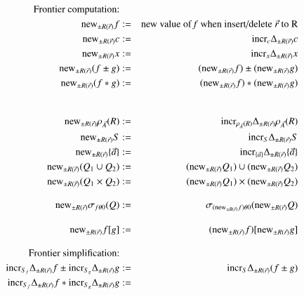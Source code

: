 \documentclass{article}
\begin{document}
%
%
\begin{figure*}
\begin{eqnarray}
\mbox{Frontier computation:} && \nonumber
\\
\nonumber\algnew_{\pm R(\vec{r})} f &:=& \mbox{new value of \emph{f} when insert/delete } \vec{r} \mbox{ to R}\\
\label{eq:new1}
\algnew_{\pm R(\vec{r})} c       &:=& \algincr_{c} \Delta_{\pm R(\vec{r})} c \\
\label{eq:new2}
\algnew_{\pm R(\vec{r})} x       &:=& \algincr_{x} \Delta_{\pm R(\vec{r})} x \\
\label{eq:new3}
\algnew_{\pm R(\vec{r})} (f \pm g) &:=&
(\algnew_{\pm R(\vec{r})} f) \pm (\algnew_{\pm R(\vec{r})} g) \\
\label{eq:new4}
\algnew_{\pm R(\vec{r})} (f * g) &:=&
(\algnew_{\pm R(\vec{r})} f) * (\algnew_{\pm R(\vec{r})} g)\\
%
%
\nonumber\\[2ex]
\label{eq:newr1}
\algnew_{\pm R(\vec{r})} \rho_{\vec{A}}(R) &:=&
   \algincr_{\rho_{\vec{A}}(R)} \Delta_{\pm R(\vec{r})} \rho_{\vec{A}}(R)
\\
\label{eq:newr2}
\algnew_{\pm R(\vec{r})} S &:=& \algincr_{S} \Delta_{\pm R(\vec{r})} S
\\
\label{eq:newr3}
\algnew_{\pm R(\vec{r})} \{ \vec{a} \} &:=&
\algincr_{\{ \vec{a} \}} \Delta_{\pm R(\vec{r})} \{ \vec{a} \}
\\
\label{eq:newr4}
\algnew_{\pm R(\vec{r})} (Q_1 \cup Q_2) &:=&
   (\algnew_{\pm R(\vec{r})} Q_1) \cup (\algnew_{\pm R(\vec{r})} Q_2)
\\
\label{eq:newr5}
\algnew_{\pm R(\vec{r})} (Q_1 \times Q_2) &:=&
   (\algnew_{\pm R(\vec{r})} Q_1) \times (\algnew_{\pm R(\vec{r})} Q_2)
%
%
\\[2ex]
\label{eq:newr6}
\algnew_{\pm R(\vec{r})} \sigma_{f \theta 0}(Q) &:=&
   \sigma_{(\algnew_{\pm R(\vec{r})} f) \theta 0}(\algnew_{\pm R(\vec{r})} Q)
%
%
\\[2ex]
\label{eq:newr7}
\algnew_{\pm R(\vec{r})} f[g] & := &
   (\algnew_{\pm R(\vec{r})} f)[\algnew_{\pm R(\vec{r})} g]
%
%
%
\\[2ex]
\mbox{Frontier simplification:} && \nonumber
\\
\label{eq:fs1}
\algincr_{S_f} \Delta_{\pm R(\vec{r})} f
    \pm \algincr_{S_g} \Delta_{\pm R(\vec{r})} g &:=&
\algincr_{S} \Delta_{\pm R(\vec{r})} (f \pm g)
\\
\label{eq:fs2}
\algincr_{S_f} \Delta_{\pm R(\vec{r})} f * \algincr_{S_g} \Delta_{\pm R(\vec{r})} g &:=&

\end{eqnarray}
\end{figure*}
\end{document}
